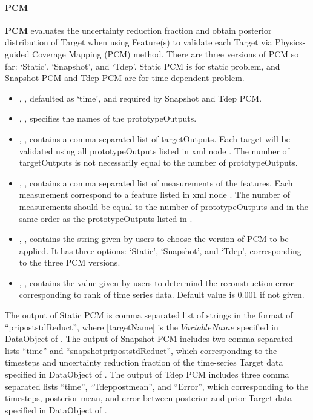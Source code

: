 \paragraph{PCM}
\textbf{PCM} evaluates the uncertainty reduction fraction and obtain posterior distribution of Target
when using Feature(s) to validate each Target via Physics-guided Coverage Mapping (PCM) method. There are
three versions of PCM so far: `Static', `Snapshot', and `Tdep'. Static PCM is for static problem, and Snapshot PCM
and Tdep PCM are for time-dependent problem.

\begin{itemize}
  \item {}, , defaulted as `time', and required by Snapshot and Tdep PCM.
  \item {}, , specifies the names of the prototypeOutputs.
  \item {}, , contains a comma separated list of
     targetOutputs. \nb Each target will be validated using all prototypeOutputs listed in xml node . The
    number of targetOutputs is not necessarily equal to the number of prototypeOutputs.
  \item {}, , contains a comma separated list of
     measurements of the features. \nb Each measurement correspond to a feature listed in xml node . The
    number of measurements should be equal to the number of prototypeOutputs and in the same order as the prototypeOutputs listed in .
  \item {}, , contains the string given by users to choose the version
    of PCM to be applied. \nb It has three options: `Static', `Snapshot', and `Tdep', corresponding to the three PCM versions.
  \item {}, , contains the value given by users to determind the
    reconstruction error corresponding to rank of time series data. Default value is 0.001 if not given.
\end{itemize}

The output of Static PCM is comma separated list of strings in the format of ``pri\textunderscore post\textunderscore stdReduct\textunderscore [targetName]'',
where [targetName] is the $VariableName$ specified in DataObject of .
The output of Snapshot PCM includes two comma separated lists ``time'' and  ``snapshot\textunderscore pri\textunderscore post\textunderscore stdReduct'',
which corresponding to the timesteps and uncertainty reduction fraction of the time-series Target data specified in DataObject of .
The output of Tdep PCM includes three comma separated lists ``time'', ``Tdep\textunderscore post\textunderscore mean'', and ``Error'',
which corresponding to the timesteps, posterior mean, and error between posterior and prior Target data specified in DataObject of .

